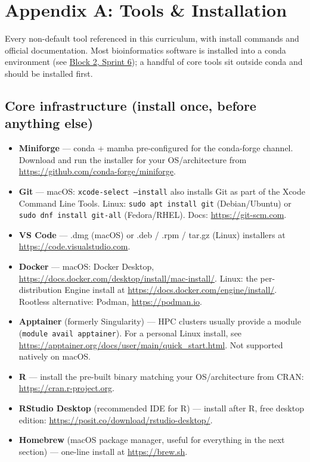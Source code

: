 \chapter{Appendix A: Tools \& Installation}\label{app:tools}

Every non-default tool referenced in this curriculum, with install commands and official documentation. Most bioinformatics software is installed into a conda environment (see \hyperref[chap:unix]{Block 2, Sprint 6}); a handful of core tools sit outside conda and should be installed first.


\section{Core infrastructure (install once, before anything else)}

\begin{itemize}[nosep]
  \item \textbf{Miniforge} --- conda + mamba pre-configured for the conda-forge channel. Download and run the installer for your OS/architecture from \url{https://github.com/conda-forge/miniforge}.
  \item \textbf{Git} --- macOS: \texttt{xcode-select --install} also installs Git as part of the Xcode Command Line Tools. Linux: \texttt{sudo apt install git} (Debian/Ubuntu) or \texttt{sudo dnf install git-all} (Fedora/RHEL). Docs: \url{https://git-scm.com}.
  \item \textbf{VS Code} --- .dmg (macOS) or .deb / .rpm / tar.gz (Linux) installers at \url{https://code.visualstudio.com}.
  \item \textbf{Docker} --- macOS: Docker Desktop, \url{https://docs.docker.com/desktop/install/mac-install/}. Linux: the per-distribution Engine install at \url{https://docs.docker.com/engine/install/}. Rootless alternative: Podman, \url{https://podman.io}.
  \item \textbf{Apptainer} (formerly Singularity) --- HPC clusters usually provide a module (\texttt{module avail apptainer}). For a personal Linux install, see \url{https://apptainer.org/docs/user/main/quick_start.html}. Not supported natively on macOS.
  \item \textbf{R} --- install the pre-built binary matching your OS/architecture from CRAN: \url{https://cran.r-project.org}.
  \item \textbf{RStudio Desktop} (recommended IDE for R) --- install after R, free desktop edition: \url{https://posit.co/download/rstudio-desktop/}.
  \item \textbf{Homebrew} (macOS package manager, useful for everything in the next section) --- one-line install at \url{https://brew.sh}.
\end{itemize}


